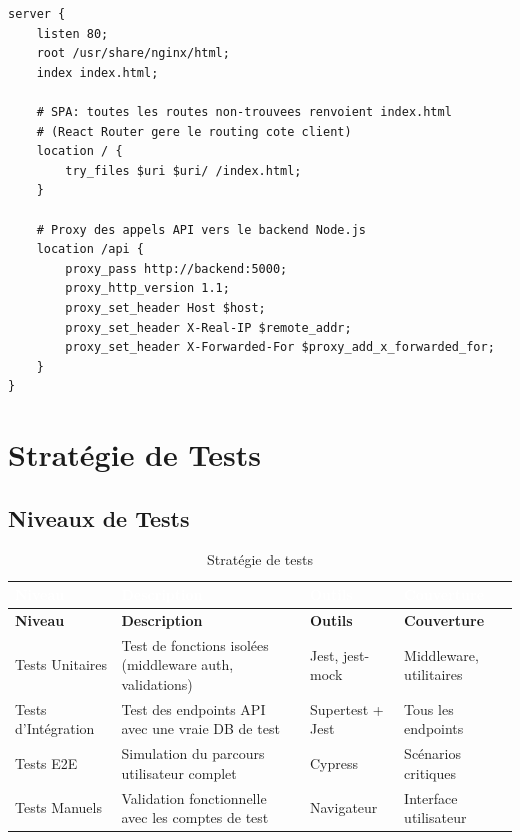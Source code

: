 \documentclass[12pt,a4paper]{report}
\begin{document}
\begin{lstlisting}[style=bash, caption={nginx.conf — Configuration du reverse proxy}]
server {
    listen 80;
    root /usr/share/nginx/html;
    index index.html;

    # SPA: toutes les routes non-trouvees renvoient index.html
    # (React Router gere le routing cote client)
    location / {
        try_files $uri $uri/ /index.html;
    }

    # Proxy des appels API vers le backend Node.js
    location /api {
        proxy_pass http://backend:5000;
        proxy_http_version 1.1;
        proxy_set_header Host $host;
        proxy_set_header X-Real-IP $remote_addr;
        proxy_set_header X-Forwarded-For $proxy_add_x_forwarded_for;
    }
}
\end{lstlisting}

\chapter{Stratégie de Tests}

\section{Niveaux de Tests}

\begin{longtable}{|L{3cm}|L{4.5cm}|L{4.5cm}|L{2cm}|}
\caption{Stratégie de tests} \\
\hline
{}\textcolor{white}{\textbf{Niveau}} & \textcolor{white}{\textbf{Description}} & \textcolor{white}{\textbf{Outils}} & \textcolor{white}{\textbf{Couverture}} \\
\hline
\endfirsthead
\hline
\textbf{Niveau} & \textbf{Description} & \textbf{Outils} & \textbf{Couverture} \\
\hline
\endhead
Tests Unitaires & Test de fonctions isolées (middleware auth, validations) & Jest, jest-mock & Middleware, utilitaires \\
\hline
Tests d'Intégration & Test des endpoints API avec une vraie DB de test & Supertest + Jest & Tous les endpoints \\
\hline
Tests E2E & Simulation du parcours utilisateur complet & Cypress & Scénarios critiques \\
\hline
Tests Manuels & Validation fonctionnelle avec les comptes de test & Navigateur & Interface utilisateur \\
\hline
\end{longtable}
\end{document}
